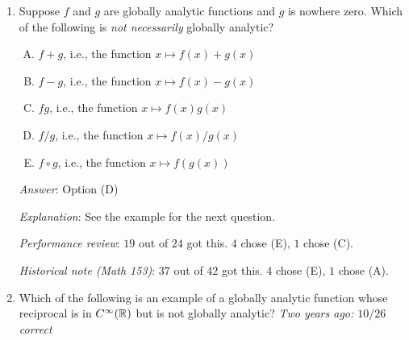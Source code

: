 \documentclass[10pt]{amsart}
\begin{document}
\begin{enumerate}
  {\em Why the other options are wrong}:

  Option (B) is not in $C^\infty(\R)$ because the function is not
  defined for $x \le -1$.

  Option (C) is not in $C^\infty(\R)$ because the function is not
  defined for $x \ge 1$.

  Options (D) and (E) are globally analytic because $\exp$ is globally
  analytic.

  {\em Performance review}: $22$ out of $24$ got this. $1$ each chose
  (C) and (E).

  {\em Historical note (Math 153)}: $28$ out of $42$ got this. $8$ chose (B),
  $6$ chose (C).

  {\em Historical note (last year)}: Nobody got this correct! $8$ chose (B),
  $3$ chose (C).

  {\em Historical note (two years ago)}: $7$ out of $26$ people got this
  correct. $6$ chose (C), $5$ chose (B), $4$ chose (E), $3$ chose (D),
  and $1$ left the question blank.

\item Suppose $f$ and $g$ are globally analytic functions and $g$ is
  nowhere zero. Which of the following is {\em not necessarily}
  globally analytic?

  \begin{enumerate}[(A)]
  \item $f + g$, i.e., the function $x \mapsto f(x) + g(x)$
  \item $f - g$, i.e., the function $x \mapsto f(x) - g(x)$
  \item $fg$, i.e., the function $x \mapsto f(x)g(x)$
  \item $f/g$, i.e., the function $x \mapsto f(x)/g(x)$
  \item $f \circ g$, i.e., the function $x \mapsto f(g(x))$
  \end{enumerate}

  {\em Answer}: Option (D)

  {\em Explanation}: See the example for the next question.

  {\em Performance review}: $19$ out of $24$ got this. $4$ chose (E),
  $1$ chose (C).

  {\em Historical note (Math 153)}: $37$ out of $42$ got this. $4$ chose (E),
  $1$ chose (A).

\item Which of the following is an example of a globally analytic
  function whose reciprocal is in $C^\infty(\R)$ but is not globally
  analytic? {\em Two years ago: $10/26$ correct}


\end{enumerate}
\end{document}
